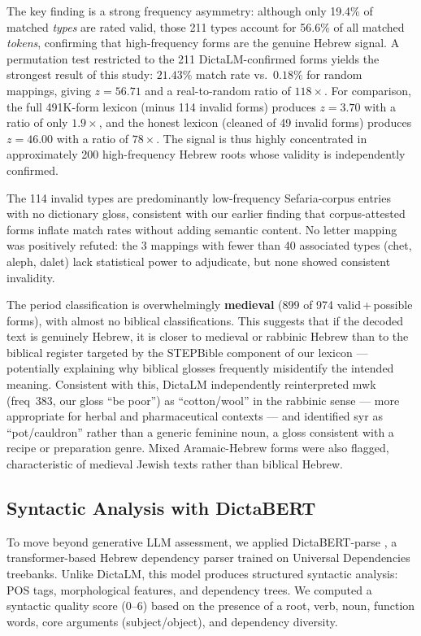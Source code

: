 \documentclass[11pt,a4paper]{article}
\newcommand{\heb}[1]{\textsf{#1}}
\begin{document}
The key finding is a strong frequency asymmetry: although only 19.4\% of
matched \emph{types} are rated valid, those 211 types account for 56.6\%
of all matched \emph{tokens}, confirming that high-frequency forms
are the genuine Hebrew signal. A permutation test restricted to the 211
DictaLM-confirmed forms yields the strongest result of this study:
$21.43\%$ match rate vs.\ $0.18\%$ for random mappings, giving
$z=56.71$ and a real-to-random ratio of $118\times$. For comparison,
the full 491K-form lexicon (minus 114 invalid forms) produces $z=3.70$
with a ratio of only $1.9\times$, and the honest lexicon (cleaned of
49 invalid forms) produces $z=46.00$ with a ratio of $78\times$.
The signal is thus highly concentrated in approximately 200
high-frequency Hebrew roots whose validity is independently confirmed.

The 114 invalid types are predominantly low-frequency Sefaria-corpus
entries with no dictionary gloss, consistent with our earlier finding
that corpus-attested forms inflate match rates without adding semantic
content. No letter mapping was positively refuted: the 3 mappings with
fewer than 40 associated types (chet, aleph, dalet) lack statistical
power to adjudicate, but none showed consistent invalidity.

The period classification is overwhelmingly \textbf{medieval} (899 of 974
valid\,+\,possible forms), with almost no biblical classifications. This
suggests that if the decoded text is genuinely Hebrew, it is closer to
medieval or rabbinic Hebrew than to the biblical register targeted by the
STEPBible component of our lexicon --- potentially explaining why biblical
glosses frequently misidentify the intended meaning. Consistent with this,
DictaLM independently reinterpreted \heb{mwk} (freq~383, our gloss ``be
poor'') as ``cotton/wool'' in the rabbinic sense --- more appropriate for
herbal and pharmaceutical contexts --- and identified \heb{syr} as
``pot/cauldron'' rather than a generic feminine noun, a gloss consistent
with a recipe or preparation genre. Mixed Aramaic-Hebrew forms were also
flagged, characteristic of medieval Jewish texts rather than biblical
Hebrew.

\subsection{Syntactic Analysis with DictaBERT}
\label{sec:dictabert}

To move beyond generative LLM assessment, we applied DictaBERT-parse
\citep{DictaBERTParse2024}, a transformer-based Hebrew dependency parser
trained on Universal Dependencies treebanks. Unlike DictaLM, this model
produces structured syntactic analysis: POS tags, morphological features,
and dependency trees. We computed a syntactic quality score (0--6) based
on the presence of a root, verb, noun, function words, core arguments
(subject/object), and dependency diversity.
\end{document}
